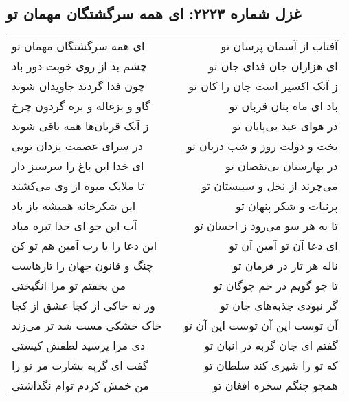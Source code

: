 \begin{center}
\section*{غزل شماره ۲۲۲۳: ای همه سرگشتگان مهمان تو}
\label{sec:2223}
\begin{longtable}{l p{0.5cm} r}
ای همه سرگشتگان مهمان تو
&&
آفتاب از آسمان پرسان تو
\\
چشم بد از روی خوبت دور باد
&&
ای هزاران جان فدای جان تو
\\
چون فدا گردند جاویدان شوند
&&
ز آنک اکسیر است جان را کان تو
\\
گاو و بزغاله و بره گردون چرخ
&&
باد ای ماه بتان قربان تو
\\
ز آنک قربان‌ها همه باقی شوند
&&
در هوای عید بی‌پایان تو
\\
در سرای عصمت یزدان تویی
&&
بخت و دولت روز و شب دربان تو
\\
ای خدا این باغ را سرسبز دار
&&
در بهارستان بی‌نقصان تو
\\
تا ملایک میوه از وی می‌کشند
&&
می‌چرند از نخل و سیبستان تو
\\
این شکرخانه همیشه باز باد
&&
پرنبات و شکر پنهان تو
\\
آب این جو ای خدا تیره مباد
&&
تا به هر سو می‌رود ز احسان تو
\\
این دعا را یا رب آمین هم تو کن
&&
ای دعا آن تو آمین آن تو
\\
چنگ و قانون جهان را تارهاست
&&
ناله هر تار در فرمان تو
\\
من بخفتم تو مرا انگیختی
&&
تا چو گویم در خم چوگان تو
\\
ور نه خاکی از کجا عشق از کجا
&&
گر نبودی جذبه‌های جان تو
\\
خاک خشکی مست شد تر می‌زند
&&
آن توست این آن توست این آن تو
\\
دی مرا پرسید لطفش کیستی
&&
گفتم ای جان گربه در انبان تو
\\
گفت ای گربه بشارت مر تو را
&&
که تو را شیری کند سلطان تو
\\
من خمش کردم توام نگذاشتی
&&
همچو چنگم سخره افغان تو
\\
\end{longtable}
\end{center}
